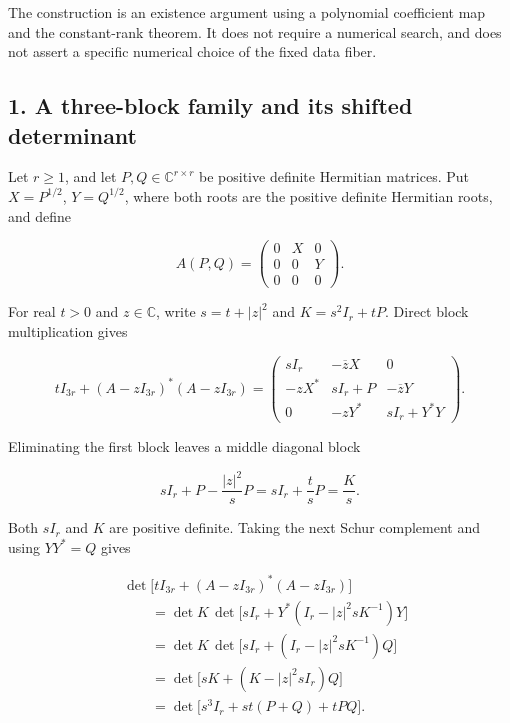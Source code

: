 \documentclass[10pt,a4paper]{article}
\begin{document}
The construction is an existence argument using a polynomial coefficient
map and the constant-rank theorem. It does not require a numerical
search, and does not assert a specific numerical choice of the fixed
data fiber.

\subsection{1. A three-block family and its shifted
determinant}\label{a-three-block-family-and-its-shifted-determinant}

Let \(r\geq1\), and let \(P,Q\in\mathbb C^{r\times r}\) be positive
definite Hermitian matrices. Put \(X=P^{1/2}\), \(Y=Q^{1/2}\), where
both roots are the positive definite Hermitian roots, and define

\nopagebreak[4]
\[
A(P,Q)=\begin{pmatrix}0&X&0\\0&0&Y\\0&0&0\end{pmatrix}.
\]

For real \(t>0\) and \(z\in\mathbb C\), write \(s=t+|z|^2\) and
\(K=s^2I_r+tP\). Direct block multiplication gives

\nopagebreak[4]
\[
tI_{3r}+(A-zI_{3r})^*(A-zI_{3r})
=\begin{pmatrix}
sI_r&-\overline zX&0\\
-zX^*&sI_r+P&-\overline zY\\
0&-zY^*&sI_r+Y^*Y
\end{pmatrix}.
\]

Eliminating the first block leaves a middle diagonal block

\nopagebreak[4]
\[
sI_r+P-\frac{|z|^2}{s}P
=sI_r+\frac tsP=\frac Ks.
\]

Both \(sI_r\) and \(K\) are positive definite. Taking the next Schur
complement and using \(YY^*=Q\) gives

\nopagebreak[4]
\[
\begin{aligned}
&\det\bigl[tI_{3r}+(A-zI_{3r})^*(A-zI_{3r})\bigr]\\
&\qquad=\det K\,
\det\bigl[sI_r+Y^*(I_r-|z|^2sK^{-1})Y\bigr]\\
&\qquad=\det K\,
\det\bigl[sI_r+(I_r-|z|^2sK^{-1})Q\bigr]\\
&\qquad=\det\bigl[sK+(K-|z|^2sI_r)Q\bigr]\\
&\qquad=\det\bigl[s^3I_r+st(P+Q)+tPQ\bigr].
\end{aligned}
\]
\end{document}
